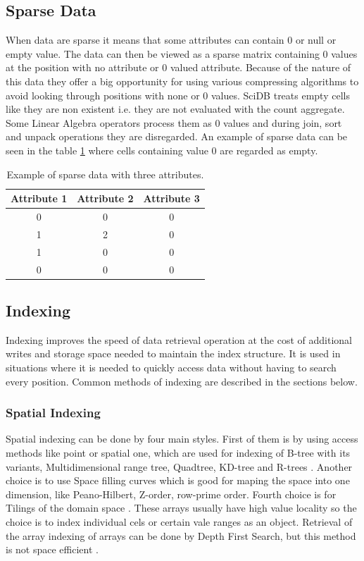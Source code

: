 \subsection{Sparse Data}
When data are sparse it means that some attributes can contain 0 or null or empty value. The data can then be viewed as a sparse matrix containing 0 values at the position with no attribute or 0 valued attribute. Because of the nature of this data they offer a big opportunity for using various compressing algorithms to avoid looking through positions with none or 0 values. SciDB \cite{scidb} treats empty cells like they are non existent i.e. they are not evaluated with the count aggregate. Some Linear Algebra operators process them as 0 values and during join, sort and unpack operations they are disregarded.
An example of sparse data can be seen in the table \ref{sparse} where cells containing value 0 are regarded as empty.

\begin{table}
\centering

\begin{tabular}{| c | c | c |}
\hline
Attribute 1 & Attribute 2 & Attribute 3 \\
\hline
0 & 0 & 0 \\
1 & 2 & 0 \\
1 & 0 & 0 \\
0 & 0 & 0 \\
\hline
\end{tabular}
\caption{Example of sparse data with three attributes.}
\label{sparse}

\end{table}

\subsection{Indexing}\label{indexing}
Indexing improves the speed of data retrieval operation at the cost of additional writes and storage space needed to maintain the index structure. It is used in situations where it is needed to quickly access data without having to search every position. Common methods of indexing are described in the sections below.

\subsubsection{Spatial Indexing}
Spatial indexing can be done by four main styles. First of them is by using access methods like point or spatial one, which are used for indexing of B-tree with its variants, Multidimensional range tree, Quadtree, KD-tree and R-trees \cite{Rtree}. Another choice is to use Space filling curves which is good for maping the space into one dimension, like Peano-Hilbert, Z-order, row-prime order. Fourth choice is for Tilings of the domain space \cite{joinFractal}. These arrays usually have high value locality so the choice is to index individual cels or certain vale ranges as an object. Retrieval of the array indexing of arrays can be done by Depth First Search, but this method is not space efficient \cite{MDindexingBTree}.

